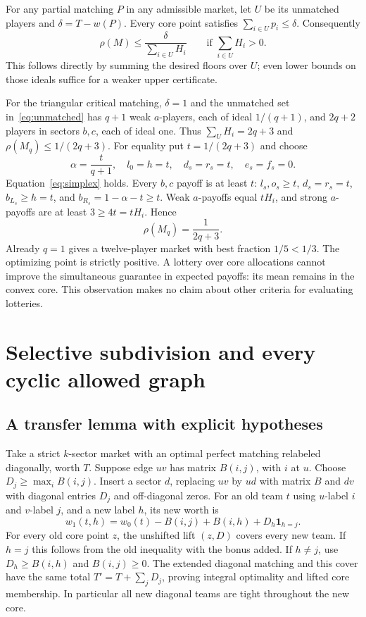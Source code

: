 \documentclass[11pt]{article}
\theoremstyle{remark}\newtheorem{remark}[theorem]{Remark}
\begin{document}
For any partial matching $P$ in any admissible market, let $U$ be its
unmatched players and $\delta=T-w(P)$. Every core point satisfies
$\sum_{i\in U}p_i\le\delta$. Consequently
\begin{equation}\label{eq:protectiondual}
 \rho(M)\le\frac{\delta}{\sum_{i\in U}H_i}
 \qquad\text{if }\sum_{i\in U}H_i>0.
\end{equation}
This follows directly by summing the desired floors over $U$; even lower
bounds on those ideals suffice for a weaker upper certificate.

For the triangular critical matching, $\delta=1$ and the unmatched set
in~\eqref{eq:unmatched} has $q+1$ weak $a$-players, each of ideal
$1/(q+1)$, and $2q+2$ players in sectors $b,c$, each of ideal one.
Thus $\sum_U H_i=2q+3$ and $\rho(M_q)\le1/(2q+3)$.
For equality put $t=1/(2q+3)$ and choose
\[
 \alpha=\frac{t}{q+1},\quad l_0=h=t,\quad
 d_s=r_s=t,\quad e_s=f_s=0.
\]
Equation~\eqref{eq:simplex} holds. Every $b,c$ payoff is at least $t$:
$l_s,o_s\ge t$, $d_s=r_s=t$, $b_{L_s}\ge h=t$, and
$b_{R_s}=1-\alpha-t\ge t$. Weak $a$-payoffs equal $tH_i$, and strong
$a$-payoffs are at least $3\ge4t=tH_i$. Hence
\[
                         \rho(M_q)=\frac1{2q+3}.
\]
Already $q=1$ gives a twelve-player market with best fraction $1/5<1/3$.
The optimizing point is strictly positive. A lottery over core allocations
cannot improve the simultaneous guarantee in expected payoffs: its mean
remains in the convex core. This observation makes no claim about other
criteria for evaluating lotteries.

\section{Selective subdivision and every cyclic allowed graph}
\subsection{A transfer lemma with explicit hypotheses}
Take a strict $k$-sector market with an optimal perfect matching relabeled
diagonally, worth $T$. Suppose edge $uv$ has matrix $B(i,j)$, with $i$ at $u$.
Choose $D_j\ge\max_i B(i,j)$. Insert a sector $d$, replacing $uv$ by
$ud$ with matrix $B$ and $dv$ with diagonal entries $D_j$ and off-diagonal
zeros. For an old team $t$ using $u$-label $i$ and $v$-label $j$, and a new
label $h$, its new worth is
\[
 w_1(t,h)=w_0(t)-B(i,j)+B(i,h)+D_h\mathbf1_{h=j}.
\]
For every old core point $z$, the unshifted lift $(z,D)$ covers every new
team. If $h=j$ this follows from the old inequality with the bonus added.
If $h\ne j$, use $D_h\ge B(i,h)$ and $B(i,j)\ge0$.
The extended diagonal matching and this cover have the same total
$T'=T+\sum_jD_j$, proving integral optimality and lifted core membership.
In particular all new diagonal teams are tight throughout the new core.
\end{document}
